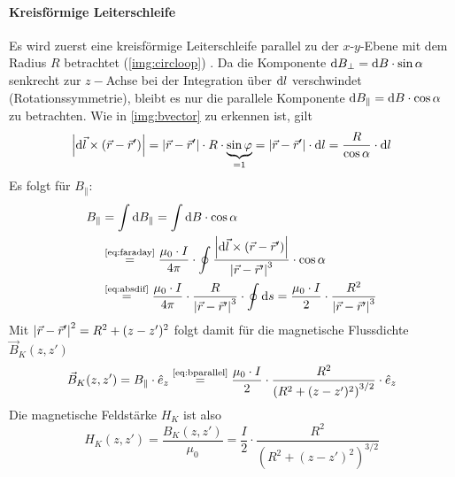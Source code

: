 \paragraph{Kreisförmige Leiterschleife}
Es wird zuerst eine kreisförmige Leiterschleife parallel zu der $x$-$y$-Ebene mit dem Radius $R$ betrachtet (\autoref{img:circloop}) \cite{dem2}. %
Da die Komponente $\mathrm{d} B_\perp = \mathrm{d} B \cdot \sin \alpha$ senkrecht zur $z-$Achse bei der Integration über $\mathrm{d} l$ verschwindet 
(Rotationssymmetrie), bleibt es nur die parallele Komponente $\mathrm{d} B_\parallel = \mathrm{d} B \cdot \cos \alpha$ zu betrachten. Wie in 
\autoref{img:bvector} zu erkennen ist, gilt
\begin{equation}
\label{eq:absdif}
  \left|\mathrm{d} \vec{l} \times \left( \vec{r} - \vec{r}' \right)\right| = \left|\vec{r} - \vec{r}'\right| \cdot R \cdot \underbrace{\sin \varphi}_{= 1} 
  = \left|\vec{r} - \vec{r}'\right| \cdot \mathrm{d} l = \frac{R}{\cos \alpha} \cdot \mathrm{d} l
\end{equation}
Es folgt für $B_\parallel$:
\begin{equation}
\begin{split}
  \label{eq:bparallel}
    B_\parallel &= \int \difd B_\parallel = \int \difd B \cdot \cos \alpha \\
  &\refeq{eq:faraday} \frac{\mu_0 \cdot I}{4 \pi} \cdot \oint \frac{\abs{\difd \vec{l} \times \left( \vec{r} - \vec{r}' \right)}}{\abs{\vec{r} - \vec{r}'}^3} \cdot \cos \alpha \\
  &\refeq{eq:absdif} \frac{\mu_0 \cdot I}{4 \pi} \cdot \frac{R}{\abs{\vec{r} - \vec{r}'}^3} \cdot \oint \difd s = \frac{\mu_0 \cdot I}{2} \cdot \frac{R^2}{\abs{\vec{r} - \vec{r}'}^3}
\end{split}
\end{equation}
Mit $\left|\vec{r} - \vec{r}'\right|^2 = R^2 + (z-z')^2$ folgt damit für die magnetische Flussdichte $\vec{B}_K(z, z')$
\begin{equation}
  \vec{B}_K(z, z') = B_\parallel \cdot \hat{e}_z \refeq{eq:bparallel} \frac{\mu_0 \cdot I}{2} \cdot \frac{R^2}{ \left( R^2 + (z-z')^2 \right)^{3/2}} \cdot \hat{e}_z
\end{equation}
Die magnetische Feldstärke $H_K$ ist also
\begin{equation}
  H_K(z, z') = \frac{B_K(z, z')}{\mu_0} = \frac{I}{2} \cdot \frac{R^2}{ \left( R^2 + (z-z')^2 \right)^{3/2}}
\end{equation}
